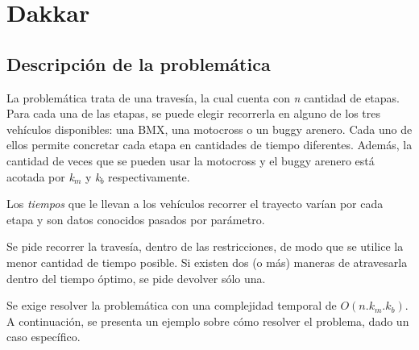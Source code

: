 \section{Dakkar}
\subsection{Descripci\'on de la problem\'atica}
La problem\'atica trata de una traves\'ia, la cual cuenta con \emph{n} cantidad de etapas. Para cada una de las etapas, se puede elegir recorrerla en alguno de los tres veh\'iculos disponibles: una BMX, una motocross o un buggy arenero. Cada uno de ellos permite concretar cada etapa en cantidades de tiempo diferentes.
Adem\'as, la cantidad de veces que se pueden usar la motocross y el buggy arenero est\'a acotada por \emph{k}$_m$ y \emph{k}$_b$ respectivamente.

Los \emph{tiempos} que le llevan a los veh\'iculos recorrer el trayecto var\'ian por cada etapa y son datos conocidos pasados por par\'ametro.

Se pide recorrer la traves\'ia, dentro de las restricciones, de modo que se utilice la menor cantidad de tiempo posible. Si existen dos (o m\'as) maneras de atravesarla dentro del tiempo
\'optimo, se pide devolver s\'olo una.

Se exige resolver la problem\'atica con una complejidad temporal de $O(n.k_m.k_b)$.\\

A continuaci\'on, se presenta un ejemplo sobre c\'omo resolver el problema, dado un caso espec\'ifico.\\

